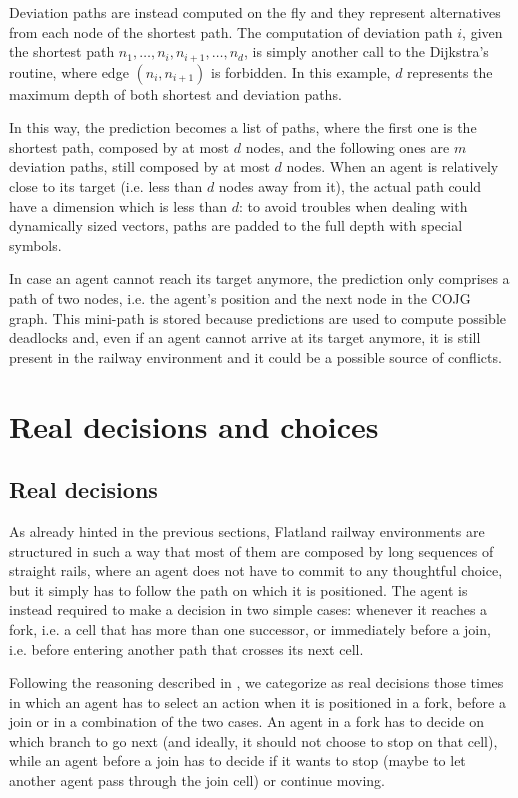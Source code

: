 \documentclass[a4paper,10pt]{report}
\begin{document}
Deviation paths are instead computed on the fly and they represent alternatives from each node of the shortest path. The computation of deviation path $i$, given the shortest path $n_1, \dots, n_i, n_{i+1}, \dots, n_d$, is simply another call to the Dijkstra's routine, where edge $(n_i, n_{i+1})$ is forbidden. In this example, $d$ represents the maximum depth of both shortest and deviation paths.

In this way, the prediction becomes a list of paths, where the first one is the shortest path, composed by at most $d$ nodes, and the following ones are $m$ deviation paths, still composed by at most $d$ nodes. When an agent is relatively close to its target (i.e. less than $d$ nodes away from it), the actual path could have a dimension which is less than $d$: to avoid troubles when dealing with dynamically sized vectors, paths are padded to the full depth with special symbols.

In case an agent cannot reach its target anymore, the prediction only comprises a path of two nodes, i.e. the agent's position and the next node in the COJG graph. This mini-path is stored because predictions are used to compute possible deadlocks and, even if an agent cannot arrive at its target anymore, it is still present in the railway environment and it could be a possible source of conflicts.

\section{Real decisions and choices}\label{sec:real-decisions-choices}

\subsection{Real decisions}\label{subsec:real-decisions}
As already hinted in the previous sections, Flatland railway environments are structured in such a way that most of them are composed by long sequences of straight rails, where an agent does not have to commit to any thoughtful choice, but it simply has to follow the path on which it is positioned. The agent is instead required to make a decision in two simple cases: whenever it reaches a fork, i.e. a cell that has more than one successor, or immediately before a join, i.e. before entering another path that crosses its next cell.

Following the reasoning described in \cite{jonas}, we categorize as real decisions those times in which an agent has to select an action when it is positioned in a fork, before a join or in a combination of the two cases. An agent in a fork has to decide on which branch to go next (and ideally, it should not choose to stop on that cell), while an agent before a join has to decide if it wants to stop (maybe to let another agent pass through the join cell) or continue moving.
\end{document}
